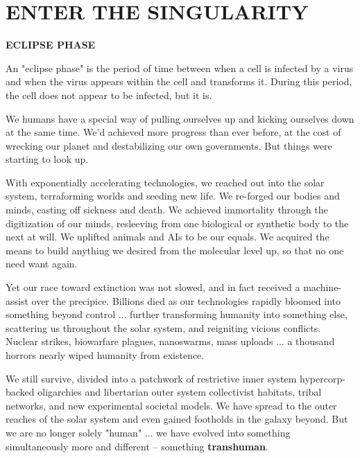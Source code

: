 \section{ENTER THE SINGULARITY}

\begin{center}
   \textbf{ECLIPSE PHASE}

   An "eclipse phase" is the period of time between when a cell is infected by
   a virus and when the virus appears within the cell and transforms it. During
   this period, the cell does not appear to be infected, but it is.
\end{center}


We humans have a special way of pulling ourselves up and kicking ourselves down
at the same time. We'd achieved more progress than ever before, at the cost of
wrecking our planet and destabilizing our own governments. But things were
starting to look up.

With exponentially accelerating technologies, we reached out into the solar
system, terraforming worlds and seeding new life. We re-forged our bodies and
minds, casting off sickness and death. We achieved immortality through the
digitization of our minds, resleeving from one biological or synthetic body to
the next at will. We uplifted animals and AIs to be our equals. We acquired
the means to build anything we desired from the molecular level up, so that no
one need want again.

Yet our race toward extinction was not slowed, and in fact received a
machine-assist over the precipice. Billions died as our technologies rapidly
bloomed into something beyond control ... further transforming humanity into
something else, scattering us throughout the solar system, and reigniting
vicious conflicts. Nuclear strikes, biowarfare plagues, nanoswarms, mass
uploads ... a thousand horrors nearly wiped humanity from existence.

We still survive, divided into a patchwork of restrictive inner system
hypercorp-backed oligarchies and libertarian outer system collectivist
habitats, tribal networks, and new experimental societal models. We have
spread to the outer reaches of the solar system and even gained footholds in
the galaxy beyond. But we are no longer solely "human" ... we have evolved
into something simultaneously more and different -- something
\textbf{transhuman}.

